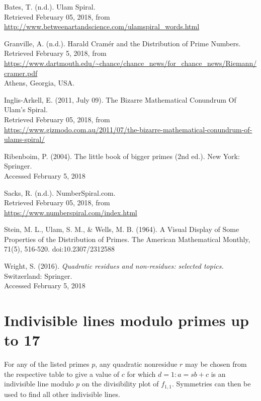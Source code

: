\documentclass{article}
\begin{document}
\begin{thebibliography}{1}
	
\bibitem{}
Bates, T. (n.d.). Ulam Spiral. \\
Retrieved February 05, 2018, from \\ 			
\url{http://www.betweenartandscience.com/ulamspiral_words.html}
	
\bibitem{}
Granville, A. (n.d.). Harald Cramér and the Distribution of Prime Numbers. \\
Retrieved February 5, 2018, from \\ 
\url{https://www.dartmouth.edu/~chance/chance_news/for_chance_news/Riemann/cramer.pdf} \\
Athens, Georgia, USA.

\bibitem{}
Inglis-Arkell, E. (2011, July 09). The Bizarre Mathematical Conundrum Of Ulam's Spiral. \\ Retrieved February 05, 2018, from \\ \url{https://www.gizmodo.com.au/2011/07/the-bizarre-mathematical-conundrum-of-ulams-spiral/}

\bibitem{}
Ribenboim, P. (2004). The little book of bigger primes (2nd ed.). New York: Springer. \\
Accessed February 5, 2018

\bibitem{}
Sacks, R. (n.d.). NumberSpiral.com. \\
Retrieved February 05, 2018, from \\
\url{https://www.numberspiral.com/index.html}

\bibitem{}
Stein, M. L., Ulam, S. M., \& Wells, M. B. (1964). A Visual Display of Some Properties of the Distribution of Primes. The American Mathematical Monthly, 71(5), 516-520. doi:10.2307/2312588

\bibitem{}
Wright, S. (2016). \textit{Quadratic residues and non-residues: selected topics.} Switzerland: Springer. \\
Accessed February 5, 2018
	
\end{thebibliography}


\newpage
\appendix

\section{Indivisible lines modulo primes up to 17}

For any of the listed primes \(p\), any quadratic nonresidue \(r\) may be chosen from the respective table to give a value of \(c\) for which \(d=1:a=sb+c\) is an indivisible line modulo \(p\) on the divisibility plot of \(f_{1,1}\). Symmetries can then be used to find all other indivisible lines.
\end{document}
